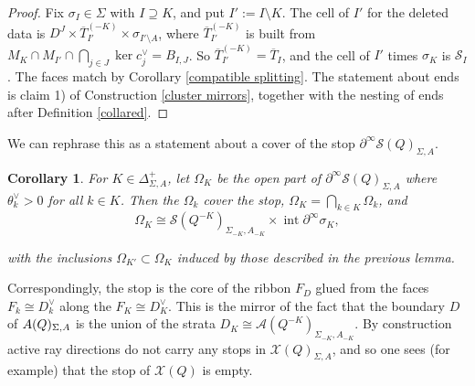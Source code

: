 \documentclass[11pt]{amsart}
\newtheorem{cor}[thm]{Corollary}
\theoremstyle{definition}
\theoremstyle{remark}
\newcommand{\A}{\mathcal{A}}
\numberwithin{equation}{section}
\begin{document}
\begin{proof}
Fix $\sigma_I\in\Sigma$ with $I\supseteq K$, and put $I':=I\setminus K$. The cell of $I'$ for the deleted data is $D^J\times\overline T^{(-K)}_{I'}\times\sigma_{I'\setminus A}$, where $\overline T^{(-K)}_{I'}$ is built from $M_K\cap M_{I'}\cap\bigcap_{j\in J}\ker c_j^\vee=B_{I,J}$. So $\overline T^{(-K)}_{I'}=\overline T_I$, and the cell of $I'$ times $\sigma_K$ is $\mathcal S_I$. The faces match by Corollary \ref{compatible splitting}. The statement about ends is claim 1) of Construction \ref{cluster mirrors}, together with the nesting of ends after Definition \ref{collared}.
\end{proof}

We can rephrase this as a statement about a cover of the stop $\partial^\infty\mathcal S(Q)_{\Sigma,A}$.

\begin{cor}\label{stop cover}
   For $K\in\Delta^+_{\Sigma,A}$, let $\Omega_K$ be the open part of $\partial^\infty\mathcal S(Q)_{\Sigma,A}$ where $\theta_k^\vee>0$ for all $k\in K$. Then the $\Omega_k$ cover the stop, $\Omega_K=\bigcap_{k\in K}\Omega_k$, and
$$\Omega_K\cong\mathcal S(Q^{-K})_{\Sigma_{-K},A_{-K}}\times\operatorname{int}\partial^\infty\sigma_K,$$

with the inclusions $\Omega_{K'}\subset\Omega_K$ induced by those described in the previous lemma.
\end{cor}

Correspondingly, the stop is the core of the ribbon $F_D$ glued from the faces $F_k\cong D_k^\vee$ along the $F_K\cong D_K^\vee$. This is the mirror of the fact that the boundary $D$ of $\mathcal \A(Q)_{\Sigma,A}$ is the union of the strata $D_K\cong\mathcal A(Q^{-K})_{\Sigma_{-K},A_{-K}}$. By construction active ray directions do not carry any stops in $\mathcal{X}(Q)_{\Sigma, A}$, and so one sees (for example) that the stop of $\mathcal{X}(Q)$ is empty.
    
    
\end{document}
